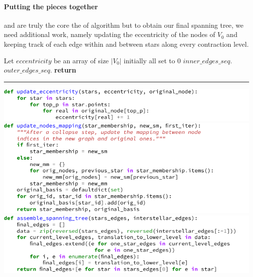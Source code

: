 \paragraph{Putting the pieces together}\label{par:full_gtx}%
\extractStar{} and \collapseStar{} are truly the core the of \gtx{} algorithm but to obtain our
final spanning tree, we need additional work, namely updating the eccentricity of the nodes of
$V_0$ and keeping track of each edge within and between stars along every contraction level.

\begin{algorithm}
  \caption{\gtx{}($G_0=(V_0,E_0)$) \label{alg:gtx}}
	\begin{algorithmic}[1]
    \State Let $eccentricity$ be an array of size $|V_0|$ initially all set to $0$
    \Repeat
      \State $inner\_edges\_seq$.
      \State {}
      \State $outer\_edges\_seq$.
    \State \textbf{return} 
		\begin{center}
      \vspace{-.5\baselineskip}
			\rule{0.5\textwidth}{.2pt}
		\end{center}
    \includegraphics{assets/tmp-code/update_eccentricity.pdf}
    \includegraphics{assets/tmp-code/update_nodes_mapping.pdf}
    \includegraphics{assets/tmp-code/assemble_spanning_tree.pdf}
	\end{algorithmic}
\end{algorithm}

